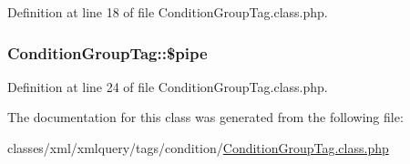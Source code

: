 Definition at line 18 of file Condition\+Group\+Tag.\+class.\+php.

\hypertarget{classConditionGroupTag_af3040978080a9af0e9f8760eb05cc58b}{
\subsubsection[{\$pipe}]{\setlength{\rightskip}{0pt plus 5cm}Condition\+Group\+Tag\+::\$pipe}}\label{classConditionGroupTag_af3040978080a9af0e9f8760eb05cc58b}


Definition at line 24 of file Condition\+Group\+Tag.\+class.\+php.



The documentation for this class was generated from the following file\+:\begin{DoxyCompactItemize}
\item 
classes/xml/xmlquery/tags/condition/\hyperlink{ConditionGroupTag_8class_8php}{Condition\+Group\+Tag.\+class.\+php}\end{DoxyCompactItemize}
